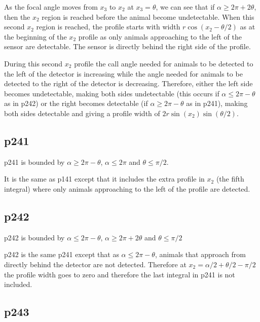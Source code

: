 As the focal angle moves from $x_3$ to $x_2$  at $x_3=\theta$, we can see that if $\alpha \ge 2\pi + 2\theta$, then the $x_2$ region is reached before the animal become undetectable. When this second $x_2$ region is reached, the profile starts with width $r\cos(x_2 - \theta/2)$ as at the beginning of the $x_2$ profile as only animals approaching to the left of the sensor are detectable. The sensor is directly behind the right side of the profile.

During this second $x_2$ profile the call angle needed for animals to be detected to the left of the detector is increasing while the angle needed for animals to be detected to the right of the detector is decreasing. Therefore, either the left side becomes undetectable, making both sides undetectable (this occurs if $\alpha \le 2\pi - \theta$ as in p242) or the right becomes detectable (if $\alpha \ge 2\pi - \theta$ as in p241), making both sides detectable and giving a profile width of $2r\sin(x_2)\sin(\theta/2)$.


\subsection{p241} \label{p241}

p241 is bounded by $\alpha \ge 2\pi - \theta$, $\alpha \le 2\pi$ and $\theta \le \pi/2$.

It is the same as p141 except that it includes the extra profile in $x_2$ (the fifth integral) where only animals approaching to the left of the profile are detected.



\subsection{p242} \label{p242}

p242 is bounded by $\alpha \le 2\pi - \theta$, $\alpha \ge 2\pi + 2\theta$ and $\theta \le \pi/2$

p242 is the same p241 except that as $\alpha \le 2\pi - \theta$, animals that approach from directly behind the detector are not detected. Therefore at $x_2 = \alpha/2 + \theta/2 - \pi/2$ the profile width goes to zero and therefore the last integral in p241 is not included.





\subsection{p243} \label{p243}

